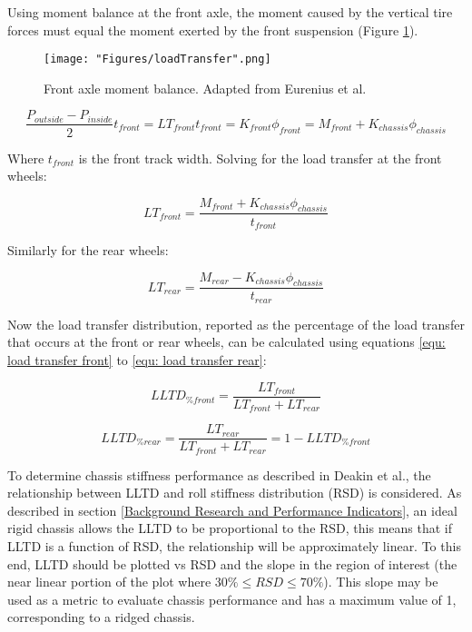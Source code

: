 \documentclass[a4paper]{article}
\numberwithin{equation}{section}
\begin{document}
Using moment balance at the front axle, the moment caused by the vertical tire forces must equal the moment exerted by the front suspension (Figure \ref{fig: load transfer}).

\begin{figure}[h]
	\begin{center}
		\texttt{[image: "Figures/loadTransfer".png]}
	\end{center}
	
	\caption{Front axle moment balance. Adapted from Eurenius et al. \cite{Chalmers}}
	\label{fig: load transfer}
\end{figure}

$$\frac{P_{outside}-P_{inside}}{2}t_{front}=LT_{front}t_{front}=K_{front}\phi_{front}=M_{front}+K_{chassis}\phi_{chassis}$$

Where $t_{front}$ is the front track width. Solving for the load transfer at the front wheels:

\begin{equation}
	LT_{front}=\frac{M_{front}+K_{chassis}\phi_{chassis}}{t_{front}}
	\label{equ: load transfer front}
\end{equation}

Similarly for the rear wheels:

\begin{equation}
	LT_{rear}=\frac{M_{rear}-K_{chassis}\phi_{chassis}}{t_{rear}}
	\label{equ: load transfer rear}
\end{equation}

Now the load transfer distribution, reported as the percentage of the load transfer that occurs at the front or rear wheels, can be calculated using equations \ref{equ: load transfer front} to \ref{equ: load transfer rear}:

\begin{equation}
LLTD_{\%front} = \frac{LT_{front}}{LT_{front}+LT_{rear}}
\label{equ: load transfer dist front}
\end{equation}

\begin{equation}
LLTD_{\%rear} = \frac{LT_{rear}}{LT_{front}+LT_{rear}} = 1 - LLTD_{\%front}
\label{equ: load transfer dist rear}
\end{equation}

To determine chassis stiffness performance as described in Deakin et al., the relationship between LLTD and roll stiffness distribution (RSD) is considered. As described in section \ref{Background Research and Performance Indicators}, an ideal rigid chassis allows the LLTD to be proportional to the RSD, this means that if LLTD is a function of RSD, the relationship will be approximately linear. To this end, LLTD should be plotted vs RSD and the slope in the region of interest (the near linear portion of the plot where $30\% \leq RSD \leq 70\%$). This slope may be used as a metric to evaluate chassis performance and has a maximum value of 1, corresponding to a ridged chassis.
\end{document}
